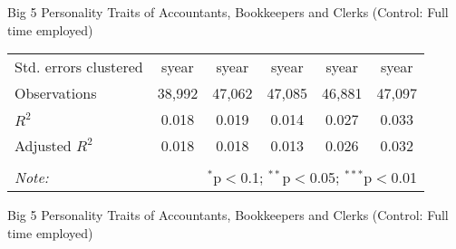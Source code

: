 \documentclass[
  9pt,
  ignorenonframetext,
]{beamer}
\begin{document}
\begin{frame}{Big 5 Personality Traits of Accountants, Bookkeepers and
Clerks (Control: Full time employed)}
\begin{center}
{\begin{tabular}{lccccc}
Std. errors clustered & syear & syear & syear & syear & syear \\ 
Observations & 38,992 & 47,062 & 47,085 & 46,881 & 47,097 \\ 
$R^{2}$ & 0.018 & 0.019 & 0.014 & 0.027 & 0.033 \\ 
Adjusted $R^{2}$ & 0.018 & 0.018 & 0.013 & 0.026 & 0.032 \\ 
\hline 
\hline \\[-1.8ex] 
\textit{Note:}  & \multicolumn{5}{r}{$^{*}$p$<$0.1; $^{**}$p$<$0.05; $^{***}$p$<$0.01} \\ 
\end{tabular}}
\end{center}
\end{frame}

\begin{frame}{Big 5 Personality Traits of Accountants, Bookkeepers and
Clerks (Control: Full time employed)}
\protect\hypertarget{big-5-personality-traits-of-accountants-bookkeepers-and-clerks-control-full-time-employed-1}{}
\begin{center}
\end{center}
\end{frame}
\end{document}
